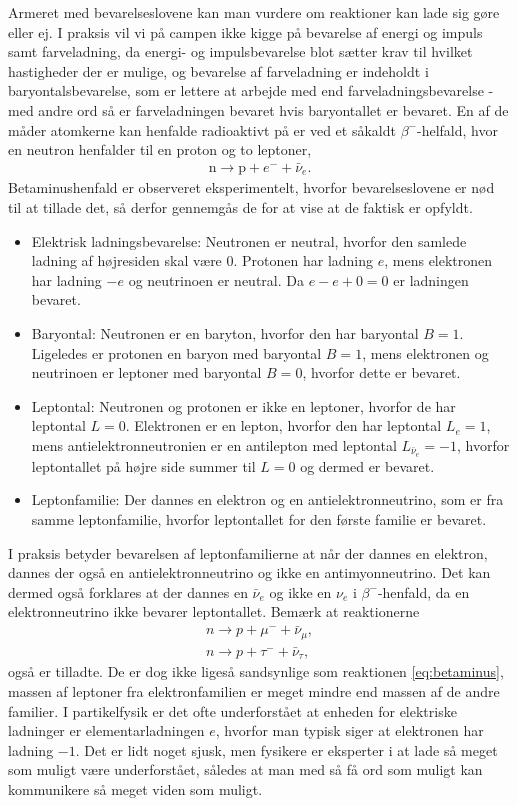 Armeret med bevarelseslovene kan man vurdere om reaktioner kan lade sig gøre eller ej. I praksis vil vi på campen ikke kigge på bevarelse af energi og impuls samt farveladning, da energi- og impulsbevarelse blot sætter krav til hvilket hastigheder der er mulige, og bevarelse af farveladning er indeholdt i baryontalsbevarelse, som er lettere at arbejde med end farveladningsbevarelse - med andre ord så er farveladningen bevaret hvis baryontallet er bevaret. En af de måder atomkerne kan henfalde radioaktivt på er ved et såkaldt $\beta^-$-helfald, hvor en neutron henfalder til en proton og to leptoner,
%
\begin{align} \label{eq:betaminus}
    \mathrm n \rightarrow \mathrm p + e^- + \bar{\nu}_e.
\end{align}
%
Betaminushenfald er observeret eksperimentelt, hvorfor bevarelseslovene er nød til at tillade det, så derfor gennemgås de for at vise at de faktisk er opfyldt.
%
\begin{itemize}
    \item Elektrisk ladningsbevarelse: Neutronen er neutral, hvorfor den samlede ladning af højresiden skal være 0. Protonen har ladning $e$, mens elektronen har ladning $-e$ og neutrinoen er neutral. Da $e-e+0=0$ er ladningen bevaret.
    \item Baryontal: Neutronen er en baryton, hvorfor den har baryontal $B=1$. Ligeledes er protonen en baryon med baryontal $B=1$, mens elektronen og neutrinoen er leptoner med baryontal $B=0$, hvorfor dette er bevaret.
    \item Leptontal: Neutronen og protonen er ikke en leptoner, hvorfor de har leptontal $L=0$. Elektronen er en lepton, hvorfor den har leptontal $L_e = 1$, mens antielektronneutronien er en antilepton med leptontal $L_{\bar{\nu}_e} = -1$, hvorfor leptontallet på højre side summer til $L=0$ og dermed er bevaret.
    \item Leptonfamilie: Der dannes en elektron og en antielektronneutrino, som er fra samme leptonfamilie, hvorfor leptontallet for den første familie er bevaret.
\end{itemize}
%
I praksis betyder bevarelsen af leptonfamilierne at når der dannes en elektron, dannes der også en antielektronneutrino og ikke en antimyonneutrino. Det kan dermed også forklares at der dannes en $\bar{\nu}_e$ og ikke en $\nu_e$ i $\beta^-$-henfald, da en elektronneutrino ikke bevarer leptontallet. Bemærk at reaktionerne
%
\begin{align}
    n \rightarrow p + \mu^- + \bar{\nu}_\mu, \\
    n \rightarrow p + \tau^- + \bar{\nu}_\tau,
\end{align}
%
også er tilladte. De er dog ikke ligeså sandsynlige som reaktionen \ref{eq:betaminus}, massen af leptoner fra elektronfamilien er meget mindre end massen af de andre familier. I partikelfysik er det ofte underforstået at enheden for elektriske ladninger er elementarladningen $e$, hvorfor man typisk siger at elektronen har ladning $-1$. Det er lidt noget sjusk, men fysikere er eksperter i at lade så meget som muligt være underforstået, således at man med så få ord som muligt kan kommunikere så meget viden som muligt.

